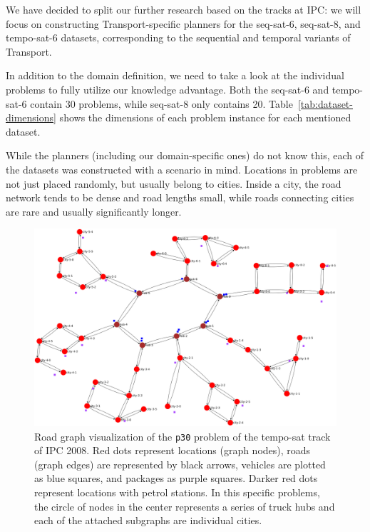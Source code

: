 We have decided to split our further research based on the tracks at IPC: we will focus on constructing
Transport-specific planners for the seq-sat-6, seq-sat-8, and tempo-sat-6 datasets,
corresponding to the sequential and temporal variants of Transport.

In addition to the domain definition, we need to take a look at the individual problems to fully utilize our knowledge advantage.
Both the seq-sat-6 and tempo-sat-6 contain 30 problems, while seq-sat-8 only contains 20. Table~\ref{tab:dataset-dimensions} shows the
dimensions of each problem instance for each mentioned dataset.

While the planners (including our domain-specific ones) do not know this,
each of the datasets was constructed with a scenario in mind. Locations in problems are not just
placed randomly, but usually belong to cities. Inside a city, the road network
tends to be dense and road lengths small, while roads connecting cities
are rare and usually significantly longer.


\begin{figure}[tb]
\begin{center}
\includegraphics[width=1.0\textwidth]{../img/ipc08_tempo-sat_p30_land}
\end{center}
\caption[Visualization of the \texttt{p30} problem of temporal Transport from IPC 2008.]{Road graph visualization of the \texttt{p30} problem of the tempo-sat track of IPC 2008. Red dots represent locations (graph nodes), roads (graph edges) are represented by black arrows, vehicles are plotted as blue squares, and packages as purple squares. Darker red dots represent locations with petrol stations. In this specific problems, the circle of nodes in the center represents a series of truck hubs and each of the attached subgraphs are individual cities.}
\label{fig:ipc08_tempo-sat_p30}
\end{figure}

